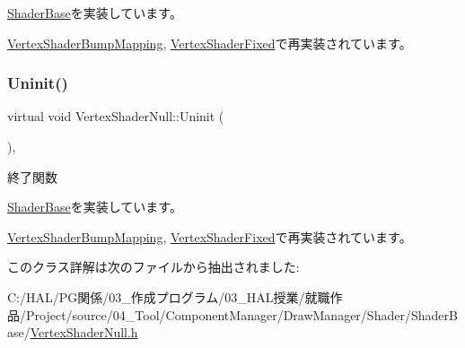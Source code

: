 \mbox{\hyperlink{class_shader_base_ac78c78ede3b8e48cf28b739b97456620}{Shader\+Base}}を実装しています。



\mbox{\hyperlink{class_vertex_shader_bump_mapping_ad81d57336763441c4071f967b57dbce1}{Vertex\+Shader\+Bump\+Mapping}}, \mbox{\hyperlink{class_vertex_shader_fixed_a87523c320f6f6767d59d7b24265db7ec}{Vertex\+Shader\+Fixed}}で再実装されています。

\mbox{\label{class_vertex_shader_null_a16334df4ac02db3dd63f042622032301}} 
\subsubsection{\texorpdfstring{Uninit()}{Uninit()}}
{\footnotesize\ttfamily virtual void Vertex\+Shader\+Null\+::\+Uninit (\begin{DoxyParamCaption}{ }\end{DoxyParamCaption})\hspace{0.3cm}{\ttfamily [inline]}, {\ttfamily [virtual]}}



終了関数 



\mbox{\hyperlink{class_shader_base_a784edfa81bec4d08a257ed4f02c61222}{Shader\+Base}}を実装しています。



\mbox{\hyperlink{class_vertex_shader_bump_mapping_abed4e0aa9655fa7a7a21e03d00e7c0e5}{Vertex\+Shader\+Bump\+Mapping}}, \mbox{\hyperlink{class_vertex_shader_fixed_a49f630aee4757c8fd8bae886f22dfeb0}{Vertex\+Shader\+Fixed}}で再実装されています。



このクラス詳解は次のファイルから抽出されました\+:\begin{DoxyCompactItemize}
\item 
C\+:/\+H\+A\+L/\+P\+G関係/03\+\_\+作成プログラム/03\+\_\+\+H\+A\+L授業/就職作品/\+Project/source/04\+\_\+\+Tool/\+Component\+Manager/\+Draw\+Manager/\+Shader/\+Shader\+Base/\mbox{\hyperlink{_vertex_shader_null_8h}{Vertex\+Shader\+Null.\+h}}\end{DoxyCompactItemize}

